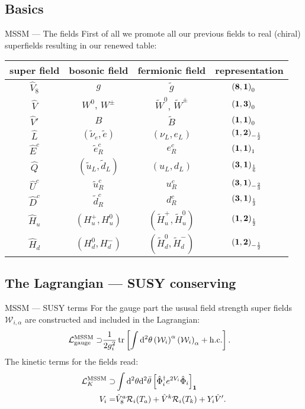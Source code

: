 \subsection{Basics}
\begin{frame}{MSSM — The fields}
First of all we promote all our previous fields to real (chiral) superfields resulting in our renewed table:\vfill
\begin{table}
\begin{tabular}{cccl}
  super field& bosonic field& fermionic field& representation\\\hline
  $\hat{V}_8$& $g$& $\tilde{g}$& $\quad\quad\left(\mathbf{8}, \mathbf{1}\right)_{0}$\\
  $\hat{V}$& $W^0$, $W^\pm$& $\tilde{W}^0$, $\tilde{W}^\pm$& $\quad\quad\left(\mathbf{1}, \mathbf{3}\right)_{0}$\\
  $\hat{V}'$& $B$& $\tilde{B}$& $\quad\quad\left(\mathbf{1}, \mathbf{1}\right)_{0}$\\
  $\hat{L}$& $(\tilde{\nu}_e, \tilde{e})$& $(\nu_L, e_L)$& $\quad\quad\left(\mathbf{1}, \mathbf{2}\right)_{-\frac12}$\\
  $\hat{E}^c$& $\tilde{e}_R^c$& $e_R^c$& $\quad\quad\left(\mathbf{1}, \mathbf{1}\right)_{1}$\\
  $\hat{Q}$& $(\tilde{u}_L, \tilde{d}_L)$& $(u_L, d_L)$& $\quad\quad\left(\mathbf{3}, \mathbf{1}\right)_{\frac16}$\\
  $\hat{U}^c$& $\tilde{u}_R^c$& $u_R^c$& $\quad\quad\left(\mathbf{3}, \mathbf{1}\right)_{-\frac23}$\\
  $\hat{D}^c$& $\tilde{d}_R^c$& $d_R^c$& $\quad\quad\left(\mathbf{3}, \mathbf{1}\right)_{\frac13}$\\
  $\hat{H}_u$& $\left(H_u^+, H_u^0\right)$& $\left(\tilde{H}_u^+, \tilde{H}_u^0\right)$& $\quad\quad\left(\mathbf{1}, \mathbf{2}\right)_{\frac12}$\\
  $\hat{H}_d$& $(H_d^0, H_d^-)$& $(\tilde{H}^0_d, \tilde{H}_d^-)$& $\quad\quad\left(\mathbf{1}, \mathbf{2}\right)_{-\frac12}$
\end{tabular}
\end{table}
\end{frame}

\subsection{The Lagrangian — SUSY conserving}
\begin{frame}{MSSM — SUSY terms}
For the gauge part the ususal field strength super fields $\mathcal{W}_{i, \alpha}$ are constructed and included in the Lagrangian:
\begin{align}
  \mathcal{L}^\mathrm{MSSM}_\mathrm{gauge}\supset&\frac1{2g_i^2}\tr\left[\int\dd^2\theta\left(\mathcal{W}_i\right)^\alpha\left(\mathcal{W}_i\right)_\alpha+\mathrm{h. c.}\right].
\end{align}
The kinetic terms for the fields read:
\begin{align}
  \mathcal{L}^\mathrm{MSSM}_K\supset&\int\dd^2\theta\dd^2\bar{\theta}\left[\hat{\Phi}^\dagger_ie^{2V_i}\hat{\Phi}_i\right]_{\mathbf{1}}\\
  V_i=&\hat{V}_8^a\mathcal{R}_i(T_a)+\hat{V}^k\mathcal{R}_i(T_k)+Y_i\hat{V}'.
\end{align}
\end{frame}

